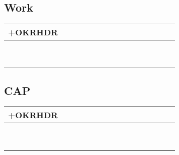 \subsection*{Work}
\begin{tabularx}{\textwidth}{|p{1.5in}|p{1.5in}||X|X|X|X|X|X|X|X|X|X|X|X|X|}
    \hline
    +OKRHDR \\ \hline\hline
    &            &    &    &    &    &    &    &    &    &    &    &    &    &    \\ \cline{2-15}
    &            &    &    &    &    &    &    &    &    &    &    &    &    &    \\ \cline{2-15}
    &            &    &    &    &    &    &    &    &    &    &    &    &    &    \\ \hline
    &            &    &    &    &    &    &    &    &    &    &    &    &    &    \\ \cline{2-15}
    &            &    &    &    &    &    &    &    &    &    &    &    &    &    \\ \cline{2-15}
    &            &    &    &    &    &    &    &    &    &    &    &    &    &    \\ \hline
    &            &    &    &    &    &    &    &    &    &    &    &    &    &    \\ \cline{2-15}
    &            &    &    &    &    &    &    &    &    &    &    &    &    &    \\ \cline{2-15}
    &            &    &    &    &    &    &    &    &    &    &    &    &    &    \\ \hline
\end{tabularx}

\subsection*{CAP}
\begin{tabularx}{\textwidth}{|p{1.5in}|p{1.5in}||X|X|X|X|X|X|X|X|X|X|X|X|X|}
    \hline
    +OKRHDR \\ \hline\hline
    &            &    &    &    &    &    &    &    &    &    &    &    &    &    \\ \cline{2-15}
    &            &    &    &    &    &    &    &    &    &    &    &    &    &    \\ \cline{2-15}
    &            &    &    &    &    &    &    &    &    &    &    &    &    &    \\ \hline
    &            &    &    &    &    &    &    &    &    &    &    &    &    &    \\ \cline{2-15}
    &            &    &    &    &    &    &    &    &    &    &    &    &    &    \\ \cline{2-15}
    &            &    &    &    &    &    &    &    &    &    &    &    &    &    \\ \hline
    &            &    &    &    &    &    &    &    &    &    &    &    &    &    \\ \cline{2-15}
    &            &    &    &    &    &    &    &    &    &    &    &    &    &    \\ \cline{2-15}
    &            &    &    &    &    &    &    &    &    &    &    &    &    &    \\ \hline
\end{tabularx}
